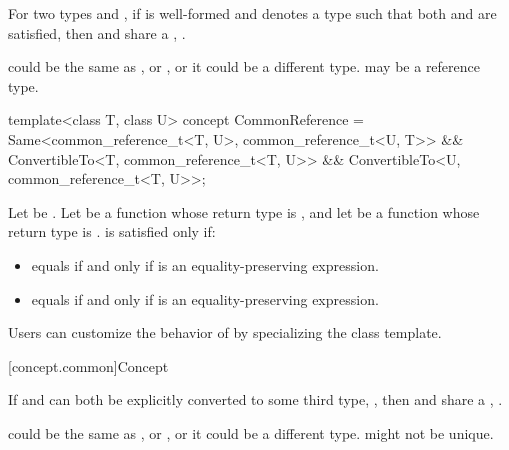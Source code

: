 \pnum
For two types  and , if 
is well-formed and denotes a type  such that both
and
are satisfied, then  and  share a
, .
\begin{note}
 could be the same as , or , or it could be a
different type.  may be a reference type.
\end{note}

%
\begin{itemdecl}
template<class T, class U>
concept CommonReference =
  Same<common_reference_t<T, U>, common_reference_t<U, T>> &&
  ConvertibleTo<T, common_reference_t<T, U>> &&
  ConvertibleTo<U, common_reference_t<T, U>>;
\end{itemdecl}

\begin{itemdescr}
\pnum
Let  be . Let  be a
function whose return type is , and let  be a function
whose return type is .  is
satisfied only if:
\begin{itemize}
\item {} equals  if and only if  is an
  equality-preserving expression.
\item {} equals  if and only if  is an
  equality-preserving expression.
\end{itemize}

\pnum
\begin{note}
Users can customize the behavior of  by specializing
the  class template.
\end{note}
\end{itemdescr}

[concept.common]{Concept }

\pnum
If  and  can both be explicitly converted to some third type,
, then  and  share a ,
.
\begin{note}
 could be the same as , or , or it could be a
different type.  might not be unique.
\end{note}


